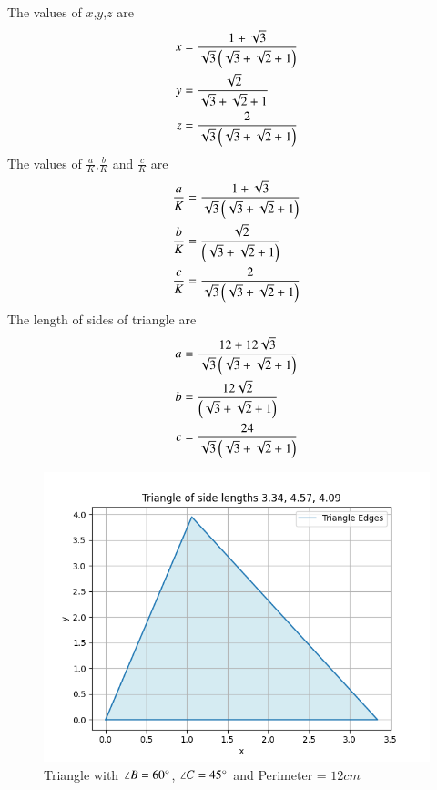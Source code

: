 \documentclass[journal]{IEEEtran}
\begin{document}
The values of $x$,$y$,$z$ are
\begin{align}
x&=\frac{1+\sqrt{3}}{\sqrt{3}\left(\sqrt{3}+\sqrt{2}+1\right)}\\
y&=\frac{\sqrt{2}}{\sqrt{3}+\sqrt{2}+1}\\
z&=\frac{2}{\sqrt{3}\left(\sqrt{3}+\sqrt{2}+1\right)}
\end{align}
The values of $\frac{a}{K}$,$\frac{b}{K}$ and $\frac{c}{K}$ are
\begin{align}
\frac{a}{K}&=\frac{1+\sqrt{3}}{\sqrt{3}\left(\sqrt{3}+\sqrt{2}+1\right)}\\
\frac{b}{K}&=\frac{\sqrt{2}}{\left(\sqrt{3}+\sqrt{2}+1\right)}\\
\frac{c}{K}&=\frac{2}{\sqrt{3}\left(\sqrt{3}+\sqrt{2}+1\right)}
\end{align}
The length of sides of triangle are
\begin{align}
a&=\frac{12+12\sqrt{3}}{\sqrt{3}\left(\sqrt{3}+\sqrt{2}+1\right)}\\
b&=\frac{12\sqrt{2}}{\left(\sqrt{3}+\sqrt{2}+1\right)}\\
c&=\frac{24}{\sqrt{3}\left(\sqrt{3}+\sqrt{2}+1\right)}
\end{align}
\begin{figure}[h!]
   \centering
   \includegraphics[width=0.7\linewidth]{figs/fig.png}
   \caption{Triangle with $\angle B=60\degree$, $\angle C=45\degree$ and Perimeter = $12cm$}
\end{figure}
\end{document}

